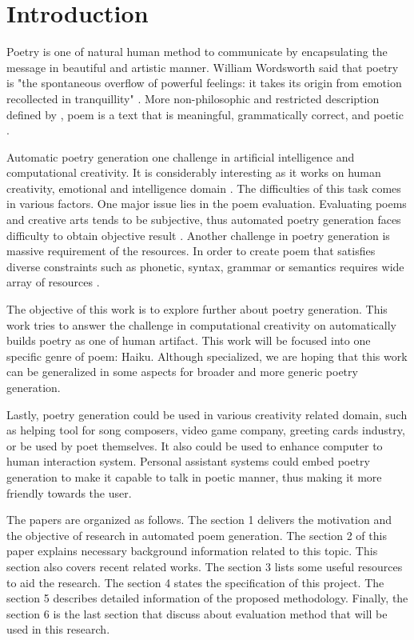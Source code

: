 \section{Introduction}


Poetry is one of natural human method to communicate by encapsulating the message in beautiful and artistic manner. William Wordsworth said that poetry is "the spontaneous overflow of powerful feelings: it takes its
origin from emotion recollected in tranquillity" \cite{wordsworth1990preface}. More non-philosophic and restricted description defined by \citeauthor{manurung2004evolutionary}, poem is a text that is meaningful, grammatically correct, and poetic \cite{manurung2004evolutionary}.

Automatic poetry generation one challenge in artificial intelligence and computational creativity. It is considerably interesting as it works on human creativity, emotional and intelligence domain \cite{colton2012computational}. The difficulties of this task comes in various factors. One major issue lies in the poem evaluation. Evaluating poems and creative arts tends to be subjective, thus automated poetry generation faces difficulty to obtain objective result \cite{binsted1996machine}. Another challenge in poetry generation is massive requirement of the resources. In order to create poem that satisfies diverse constraints such as phonetic, syntax, grammar or semantics requires wide array of resources \cite{manurung2000towards}. 

The objective of this work is to explore further about poetry generation. This work tries to answer the challenge in computational creativity on automatically builds poetry as one of human artifact. This work will be focused into one specific genre of poem: Haiku. Although specialized, we are hoping that this work can be generalized in some aspects for broader and more generic poetry generation. 

Lastly, poetry generation could be used in various creativity related domain, such as helping tool for song composers, video game company, greeting cards industry, or be used by poet themselves. It also could be used to enhance computer to human interaction system. Personal assistant systems could embed poetry generation to make it capable to talk in poetic manner, thus making it more friendly towards the user. 

 The papers are organized as follows. The section 1 delivers the motivation and the objective of research in automated poem generation. The section 2 of this paper explains necessary background information related to this topic. This section also covers recent related works. The section 3 lists some useful resources to aid the research. The section 4 states the specification of this project. The section 5 describes detailed information of the proposed methodology. Finally, the section 6 is the last section that discuss about evaluation method that will be used in this research.



